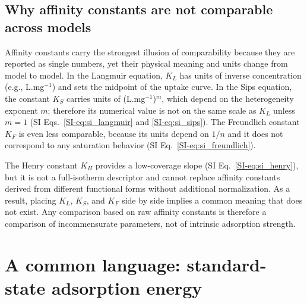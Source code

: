\documentclass[journal=jacsat,manuscript=article]{achemso}
\begin{document}
\subsection{Why affinity constants are not comparable across models}
\label{sec:kaff_problem}


Affinity constants carry the strongest illusion of comparability because they
are reported as single numbers, yet their physical meaning and units change
from model to model. In the Langmuir equation, $K_L$ has units of inverse
concentration (e.g., L.mg$^{-1}$) and sets the midpoint of the uptake curve.
In the Sips equation, the constant $K_S$ carries units of
(L.mg$^{-1}$)$^{m}$, which depend on the heterogeneity exponent $m$; therefore
its numerical value is not on the same scale as $K_L$ unless $m = 1$
(SI Eqs.~\eqref{SI-eq:si_langmuir} and \eqref{SI-eq:si_sips}). The Freundlich
constant $K_F$ is even less comparable, because its units depend on $1/n$ and it
does not correspond to any saturation behavior (SI
Eq.~\eqref{SI-eq:si_freundlich}).

The Henry constant $K_H$ provides a low-coverage slope (SI
Eq.~\eqref{SI-eq:si_henry}), but it is not a
full-isotherm descriptor and cannot replace affinity constants derived from
different functional forms without additional normalization. As a result,
placing $K_L$, $K_S$, and $K_F$ side by side implies a common meaning that does
not exist. Any comparison based on raw affinity constants is therefore a
comparison of incommensurate parameters, not of intrinsic adsorption strength.

	\section{A common language: standard-state adsorption energy}
	\label{sec:proposal}
\end{document}
